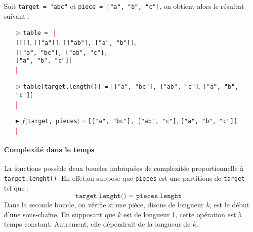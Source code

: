 \documentclass[9pt]{report}
\begin{document}
\begin{multicols*}{2}
  \begin{EExample}{}{}
    Soit \texttt{target = "abc"} et \texttt{piece = ["a", "b", "c"]}, on obtient 
    alors le résultat suivant : 
    \begin{itemize}
      \item [$\rhd$] \texttt{table = } \textcolor{red}{[}
        \\ \texttt{\textcolor{myb}{[}[]\textcolor{myb}{]}}, 
        \texttt{\textcolor{myb}{[}["a"]\textcolor{myb}{]}}, 
        \texttt{\textcolor{myb}{[}["ab"], ["a", "b"]\textcolor{myb}{]}}, \\
        \texttt{\textcolor{myb}{[}["a", "bc"], ["ab", "c"]}, \\ 
        \texttt{["a", "b", "c"]\textcolor{myb}{]}} \\
        \textcolor{red}{]}
      \item [$\rhd$] \texttt{table[target.length()] =}  
        \texttt{\textcolor{myb}{[}["a", "bc"], ["ab", "c"]},  
        \texttt{["a", "b", "c"]\textcolor{myb}{]}} \\
        \textcolor{red}{]}
      \item[$\blacktriangleright$] $f($\texttt{target, pieces}$)$ \texttt{=} 
        \texttt{\textcolor{myb}{[}["a", "bc"], ["ab", "c"]},  
        \texttt{["a", "b", "c"]\textcolor{myb}{]}} \\
        \textcolor{red}{]}


 
    \end{itemize}
     
  \end{EExample}


  \paragraph{Complexité dans le temps}
  La fonctions possède deux boucles imbriquées de complexitée proportionnelle à
  \texttt{target.lenght()}. En effet,on suppose que \texttt{pieces} est une partitions de \texttt{target}   
  tel que :
  \[ \texttt{target.lenght() = pieces.lenght}  \]
  Dans la seconde boucle, on vérifie si une pièce, disons de longueur $k$, 
  est le début d'une sous-chaîne. En supposant que $k$ est de longueur 1, cette opération 
  est à temps constant. Autrement, elle dépendrait de la longueur de $k$.



\end{multicols*}
\end{document}
